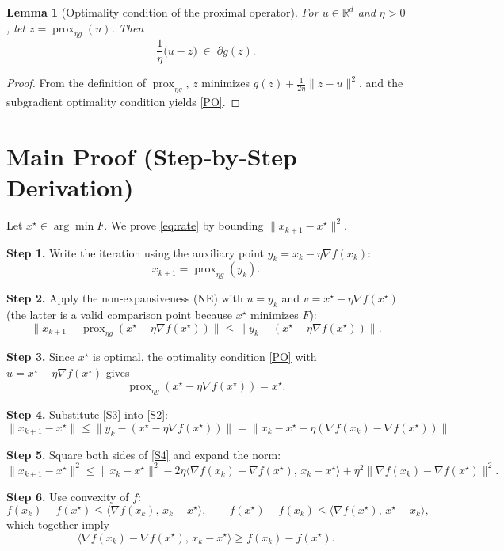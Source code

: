\documentclass{article}
\newtheorem{lemma}{Lemma}
\newcommand{\prox}{\operatorname{prox}}
\newcommand{\R}{\mathbb{R}}
\begin{document}
\begin{lemma}[Optimality condition of the proximal operator]\label{lem:proxopt}
For $u\in\R^{d}$ and $\eta>0$, let $z=\prox_{\eta g}(u)$. Then
\[
\frac{1}{\eta}\bigl(u-z\bigr)\;\in\;\partial g(z).
\tag{PO}
\]
\end{lemma}
\begin{proof}
From the definition of $\prox_{\eta g}$, $z$ minimizes $g(z)+\frac{1}{2\eta}\|z-u\|^{2}$, and the subgradient optimality condition yields \eqref{PO}. \qedhere
\end{proof}

\section*{Main Proof (Step‑by‑Step Derivation)}
Let $x^{\star}\in\arg\min F$. We prove \eqref{eq:rate} by bounding $ \|x_{k+1}-x^{\star}\|^{2}$.

\bigskip
\noindent\textbf{Step 1.} Write the iteration using the auxiliary point $y_{k}=x_{k}-\eta\nabla f(x_{k})$:
\[
x_{k+1}= \prox_{\eta g}(y_{k}).
\tag{S1}
\]

\noindent\textbf{Step 2.} Apply the non‑expansiveness (NE) with $u=y_{k}$ and $v=x^{\star}-\eta\nabla f(x^{\star})$ (the latter is a valid comparison point because $x^{\star}$ minimizes $F$):
\[
\|x_{k+1}-\prox_{\eta g}(x^{\star}-\eta\nabla f(x^{\star}))\|
\le\|y_{k}-(x^{\star}-\eta\nabla f(x^{\star}))\|.
\tag{S2}
\]

\noindent\textbf{Step 3.} Since $x^{\star}$ is optimal, the optimality condition \eqref{PO} with $u=x^{\star}-\eta\nabla f(x^{\star})$ gives
\[
\prox_{\eta g}(x^{\star}-\eta\nabla f(x^{\star}))=x^{\star}.
\tag{S3}
\]

\noindent\textbf{Step 4.} Substitute \eqref{S3} into \eqref{S2}:
\[
\|x_{k+1}-x^{\star}\|\le\|y_{k}-(x^{\star}-\eta\nabla f(x^{\star}))\|
= \|x_{k}-x^{\star}-\eta(\nabla f(x_{k})-\nabla f(x^{\star}))\|.
\tag{S4}
\]

\noindent\textbf{Step 5.} Square both sides of \eqref{S4} and expand the norm:
\[
\|x_{k+1}-x^{\star}\|^{2}
\le\|x_{k}-x^{\star}\|^{2}
-2\eta\langle\nabla f(x_{k})-\nabla f(x^{\star}),\,x_{k}-x^{\star}\rangle
+\eta^{2}\|\nabla f(x_{k})-\nabla f(x^{\star})\|^{2}.
\tag{S5}
\]

\noindent\textbf{Step 6.} Use convexity of $f$:
\[
f(x_{k})-f(x^{\star})\le\langle\nabla f(x_{k}),\,x_{k}-x^{\star}\rangle,
\qquad
f(x^{\star})-f(x_{k})\le\langle\nabla f(x^{\star}),\,x^{\star}-x_{k}\rangle,
\]
which together imply
\[
\langle\nabla f(x_{k})-\nabla f(x^{\star}),\,x_{k}-x^{\star}\rangle
\ge f(x_{k})-f(x^{\star}).
\tag{S6}
\]
\end{document}
